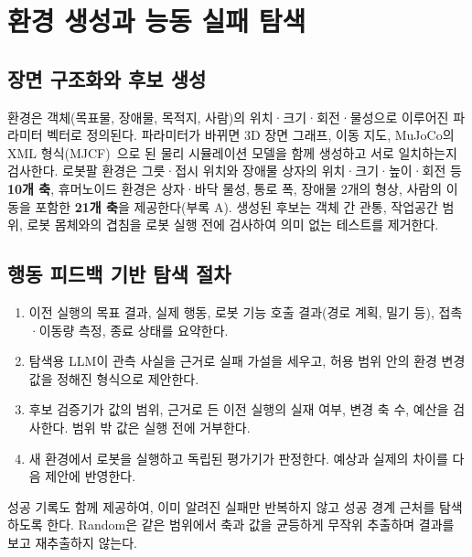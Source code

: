 \section{환경 생성과 능동 실패 탐색}

\subsection*{장면 구조화와 후보 생성}
환경은 객체(목표물, 장애물, 목적지, 사람)의 위치·크기·회전·물성으로 이루어진 파라미터
벡터로 정의된다. 파라미터가 바뀌면 3D 장면 그래프, 이동 지도, MuJoCo의 XML 형식(MJCF)~\cite{mjcf}으로 된 물리 시뮬레이션 모델을 함께 생성하고
서로 일치하는지 검사한다. 로봇팔 환경은 그릇·접시 위치와 장애물 상자의 위치·크기·높이·회전
등 \textbf{10개 축}, 휴머노이드 환경은 상자·바닥 물성, 통로 폭, 장애물 2개의 형상, 사람의 이동을
포함한 \textbf{21개 축}을 제공한다(부록 A). 생성된 후보는 객체 간 관통, 작업공간 범위, 로봇
몸체와의 겹침을 로봇 실행 전에 검사하여 의미 없는 테스트를 제거한다.

\subsection*{행동 피드백 기반 탐색 절차}
\begin{enumerate}
\item 이전 실행의 목표 결과, 실제 행동, 로봇 기능 호출 결과(경로 계획, 밀기 등), 접촉·이동량 측정, 종료 상태를 요약한다.
\item 탐색용 LLM이 관측 사실을 근거로 실패 가설을 세우고, 허용 범위 안의 환경 변경값을 정해진 형식으로 제안한다.
\item 후보 검증기가 값의 범위, 근거로 든 이전 실행의 실재 여부, 변경 축 수, 예산을 검사한다. 범위 밖 값은 실행 전에 거부한다.
\item 새 환경에서 로봇을 실행하고 독립된 평가기가 판정한다. 예상과 실제의 차이를 다음 제안에 반영한다.
\end{enumerate}
성공 기록도 함께 제공하여, 이미 알려진 실패만 반복하지 않고 성공 경계 근처를 탐색하도록 한다.
Random은 같은 범위에서 축과 값을 균등하게 무작위 추출하며 결과를 보고 재추출하지 않는다.

